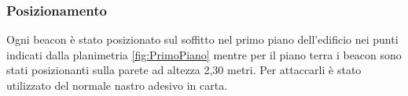 \documentclass[../SperimentazioniPratiche.tex]{subfiles}
\begin{document}
		\subsubsection{Posizionamento}
			Ogni beacon è stato posizionato sul soffitto nel primo piano dell'edificio nei punti indicati dalla planimetria \ref{fig:PrimoPiano} mentre per il piano terra i beacon sono stati posizionanti sulla parete ad altezza 2,30 metri. Per attaccarli è stato utilizzato del normale nastro adesivo in carta.
	
\end{document}
